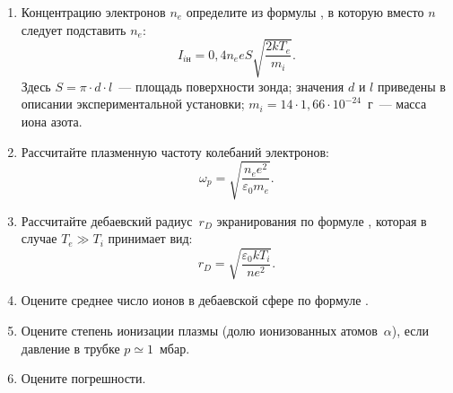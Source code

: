 \begin{lab:task}
\begin{enumerate}
\item Концентрацию электронов $n_e$ определите из формулы , в которую вместо $n$ следует подставить $n_e$:
\begin{equation}
	I_{i\text{н}}=0,4n_e eS\sqrt{\frac{2kT_e}{m_i}}.
\end{equation}
Здесь $S=\pi\cdot d\cdot l$~--- площадь поверхности зонда; значения $d$ и $l$ приведены в описании экспериментальной
установки; $m_i=14\cdot 1,66\cdot 10^{-24}$~г~--- масса иона азота.

\item Рассчитайте плазменную частоту колебаний электронов:
\begin{equation}
\omega_p=\sqrt{\frac{n_e e^2}{\varepsilon_0 m_e}}.
\end{equation}

\item Рассчитайте дебаевский радиус~$r_{D}$ экранирования по формуле , которая в случае $T_{e} \gg T_{i}$ принимает вид:
\begin{equation}
	r_{D}=\sqrt{\frac{\varepsilon_{0}kT_{i}}{n e^{2}}}.
\end{equation}

\item Оцените среднее число ионов в дебаевской сфере по формуле .

\item Оцените степень ионизации плазмы (долю ионизованных атомов~$\alpha$), если давление в трубке $p \simeq1$~мбар.

\item Оцените погрешности.

\end{enumerate}

\end{lab:task}